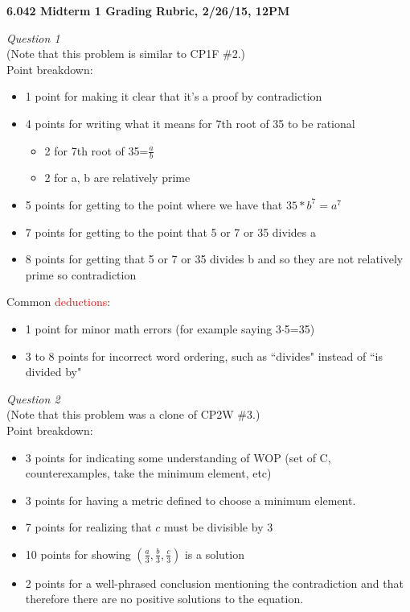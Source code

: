 \documentclass[12pt]{article}
\begin{document}
\noindent
\textbf{6.042 Midterm 1 Grading Rubric, 2/26/15, 12PM}

\noindent
\emph{Question 1}\\
(Note that this problem is similar to CP1F \#2.)\\
Point breakdown:
\begin{itemize}
\item 1 point for making it clear that it's a proof by contradiction
\item 4 points for writing what it means for 7th root of 35 to be rational
	\begin{itemize}
	\item 2 for 7th root of 35=$\frac{a}{b} $
	\item 2 for a, b are relatively prime
	\end{itemize}
\item 5 points for getting to the point where we have that $35*b^7=a^7$
\item 7 points for getting to the point that 5 or 7 or 35 divides a
\item 8 points for getting that 5 or 7 or 35 divides b and so they are not relatively prime so contradiction
\end{itemize}
\noindent
Common \textcolor{red}{deductions}:
\begin{itemize}
\item 1 point for minor math errors (for example saying 3$\cdot$5=35)
\item 3 to 8 points for incorrect word ordering, such as ``divides" instead of ``is divided by"
\end{itemize}

\noindent
\emph{Question 2}\\
(Note that this problem was a clone of CP2W \#3.)\\
Point breakdown:
\begin{itemize}
\item 3 points for indicating some understanding of WOP (set of C, counterexamples, take the minimum element, etc) 
\item 3 points for having a metric defined to choose a minimum element.
\item 7 points for realizing that $c$ must be divisible by 3
\item 10 points for showing $(\frac{a}{3}, \frac{b}{3}, \frac{c}{3})$ is a solution
\item 2 points for a well-phrased conclusion mentioning the contradiction and that therefore there are no positive solutions to the equation.
\end{itemize}
\end{document}
